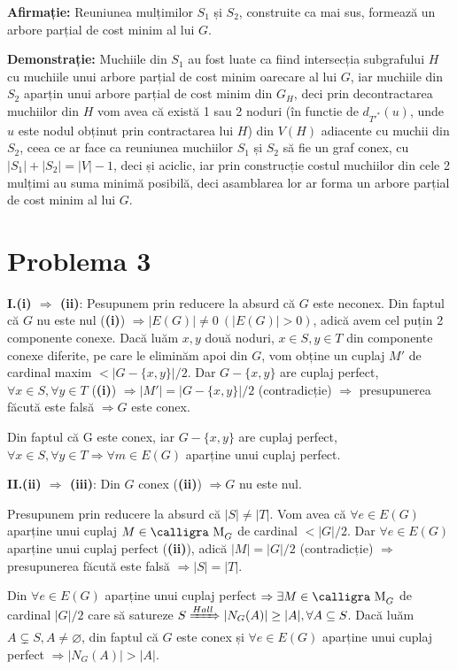 \documentclass[a4paper,12pt]{article}
\begin{document}
\textbf{Afirmație:} Reuniunea mulțimilor $S_1$ și $S_2$, construite ca mai sus, formează un arbore parțial de cost minim al lui $G$.
 
\textbf{Demonstrație:} Muchiile din $S_1$ au fost luate ca fiind intersecția subgrafului $H$ cu muchiile unui arbore parțial de cost minim oarecare al lui $G$, iar muchiile din $S_2$ aparțin unui arbore parțial de cost minim din $G_{H}$, deci prin decontractarea muchiilor din $H$ vom avea că există 1 sau 2 noduri (în functie de $d_{T'^{*}}(u)$, unde $u$ este nodul obținut prin contractarea lui $H$) din $V(H)$ adiacente cu muchii din $S_2$, ceea ce ar face ca reuniunea muchiilor $S_1$ și $S_2$ să fie un graf conex, cu $|S_1| + |S_2| = |V|-1$, deci și aciclic, iar prin construcție costul muchiilor din cele 2 mulțimi au suma minimă posibilă, deci asamblarea lor ar forma un arbore parțial de cost minim al lui $G$.

\section{Problema 3}

\textbf{I.(i) $\Rightarrow$ (ii)}: Pesupunem prin reducere la absurd că $G$ este neconex. Din faptul că $G$ nu este nul (\textbf{(i)}) $\Rightarrow |E(G)| \neq 0\ (|E(G)| > 0)$, adică avem cel puțin 2 componente conexe. Dacă luăm $x,y$ două noduri, $x \in S, y \in T$ din componente conexe diferite, pe care le eliminăm apoi din $G$, vom obține un cuplaj $M'$ de cardinal maxim $< |G-\{x,y\}|/2$. Dar $G-\{x,y\}$ are cuplaj perfect,$\forall x \in S, \forall y \in T$ (\textbf{(i)}) $\Rightarrow |M'| = |G-\{x,y\}|/2$ (contradicție) $\Rightarrow$ presupunerea făcută este falsă $\Rightarrow G$ este conex. 

Din faptul că G este conex, iar $G-\{x,y\}$ are cuplaj perfect,$\forall x \in S, \forall y \in T \Rightarrow \forall m \in E(G)$ aparține unui cuplaj perfect.

\textbf{II.(ii) $\Rightarrow$ (iii)}: Din $G$ conex (\textbf{(ii)}) $\Rightarrow G$ nu este nul.

Presupunem prin reducere la absurd că $|S| \neq |T|$. Vom avea că $\forall e \in E(G)$ aparține unui cuplaj $M \in \text{{\calligra M}}_G$ de cardinal $ < |G|/2$. Dar $\forall e \in E(G)$ aparține unui cuplaj perfect (\textbf{(ii)}), adică $|M| = |G|/2$ (contradicție) $\Rightarrow$ presupunerea făcută este falsă $\Rightarrow |S| = |T|$. 

Din $\forall e \in E(G)$ aparține unui cuplaj perfect $\Rightarrow \exists M \in \text{{\calligra M}}_G$ de cardinal $|G|/2$ care să satureze $S \xRightarrow{Hall} |N_G(A)| \geq |A|, \forall A \subseteq S$. Dacă luăm $A \subsetneq S, A \neq \varnothing$, din faptul că $G$ este conex și $\forall e \in E(G)$ aparține unui cuplaj perfect $\Rightarrow |N_G(A)| > |A|$.
\end{document}
